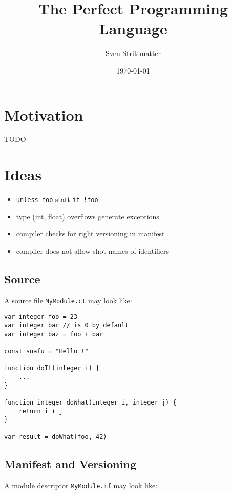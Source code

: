 \documentclass[a4paper,12pt]{article}
\title{The Perfect Programming Language}
\author{Sven Strittmatter}
\date{\today}
\begin{document}
\maketitle
{}

\section*{Motivation}

TODO

\section*{Ideas}

\begin{itemize}
	\item \texttt{unless foo} statt \texttt{if !foo}
	\item type (int, float) overflows generate exceptions
	\item compiler checks for right versioning in manifest
	\item compiler does not allow shot names of identifiers
\end{itemize}

\subsection*{Source}

A source file \texttt{MyModule.ct} may look like:

\begin{verbatim}
var integer foo = 23
var integer bar // is 0 by default
var integer baz = foo + bar

const snafu = "Hello !"

function doIt(integer i) {
    ...
}

function integer doWhat(integer i, integer j) {
    return i + j
}

var result = doWhat(foo, 42)	
\end{verbatim}

\subsection*{Manifest and Versioning}

A module descriptor \texttt{MyModule.mf} may look like:
\end{document}
